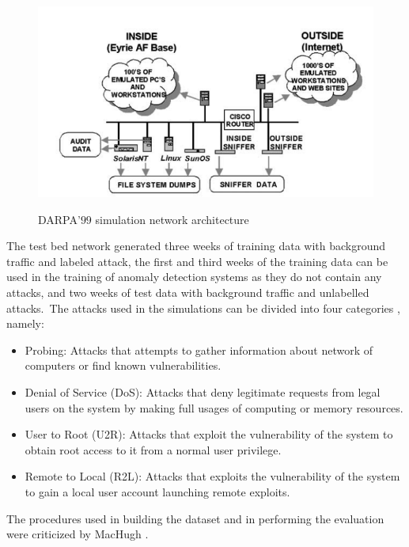 					\begin{figure}[h!]
						\centering
						\includegraphics[scale=0.7]{figures/Network.PNG}
						\caption{DARPA'$99$ simulation network architecture}
						\cite{DARPAEvaluation}
						\label{DARPA archi}	
					\end{figure}
						
					The test bed network generated three weeks of training data with background traffic and labeled attack, the first and third weeks of the training data can be used in the training of anomaly detection systems as they do not contain any attacks, and two weeks of test data with background traffic and unlabelled attacks.\ The attacks used in the simulations can be divided into four categories \cite{ComparativeStudy}, namely:

					\begin{itemize}
						\item {Probing:} Attacks that attempts to gather information about network of computers or find known vulnerabilities.
						\item {Denial of Service (DoS):} Attacks that deny legitimate requests from legal users on the system by making full usages of computing or memory resources.
						\item {User to Root (U2R):} Attacks that exploit the vulnerability of the system to obtain root access to it from a normal user privilege.
						\item {Remote to Local (R2L):} Attacks that exploits the vulnerability of the system to gain a local user account launching remote exploits.
					\end{itemize}
					
					The procedures used in building the dataset and in performing the evaluation were criticized by MacHugh \cite{DARPACritique}.

